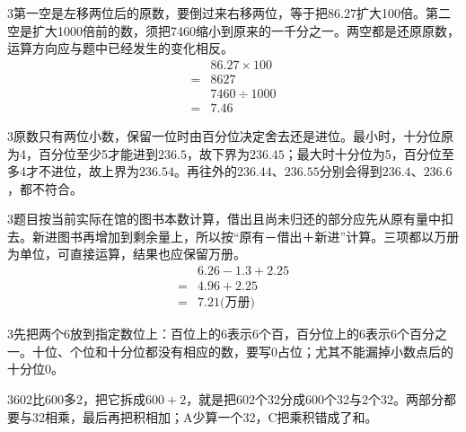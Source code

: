 \documentclass[multi=snippet,border={5bp 20bp 5bp 5bp}]{standalone}
\newenvironment{snippet}[3]{\begin{minipage}{#1bp}\color{answerred}\fontsize{#2}{#3}\selectfont\raggedright}{\end{minipage}}
\begin{document}
\begin{snippet}{505}{11.5}{14}\begin{multicols}{3}\raggedcolumns 第一空是左移两位后的原数，要倒过来右移两位，等于把\(86.27\)\allowbreak 扩大100倍。第二空是扩大1000倍前的数，须把7460缩小到原来的一千分之一。两空都是还原原数，运算方向应与题中已经发生的变化相反。\[\begin{aligned}&86.27\times100\\={}&8627\\&7460\div1000\\={}&7.46\end{aligned}\]\end{multicols}\end{snippet}
\begin{snippet}{505}{11.5}{14}\begin{multicols}{3}\raggedcolumns 原数只有两位小数，保留一位时由百分位决定舍去还是进位。最小时，十分位原为4，百分位至少5才能进到\(236.5\)\allowbreak ，故下界为\(236.45\)\allowbreak ；最大时十分位为5，百分位至多4才不进位，故上界为\(236.54\)\allowbreak 。再往外的\(236.44\)\allowbreak 、\(236.55\)\allowbreak 分别会得到\(236.4\)\allowbreak 、\(236.6\)\allowbreak ，都不符合。\end{multicols}\end{snippet}
\begin{snippet}{505}{11.5}{14}\begin{multicols}{3}\raggedcolumns 题目按当前实际在馆的图书本数计算，借出且尚未归还的部分应先从原有量中扣去。新进图书再增加到剩余量上，所以按“原有－借出＋新进”计算。三项都以万册为单位，可直接运算，结果也应保留万册。\[\begin{aligned}&6.26-1.3+2.25\\={}&4.96+2.25\\={}&7.21\text{(万册)}\end{aligned}\]\end{multicols}\end{snippet}
\begin{snippet}{505}{11.5}{14}\begin{multicols}{3}\raggedcolumns 先把两个6放到指定数位上：百位上的6表示6个百，百分位上的6表示6个百分之一。十位、个位和十分位都没有相应的数，要写0占位；尤其不能漏掉小数点后的十分位0。\end{multicols}\end{snippet}
\begin{snippet}{505}{11.5}{14}\begin{multicols}{3}\raggedcolumns 602比600多2，把它拆成\(600+2\)\allowbreak ，就是把602个32分成600个32与2个32。两部分都要与32相乘，最后再把积相加；A少算一个32，C把乘积错成了和。\end{multicols}\end{snippet}
\end{document}
